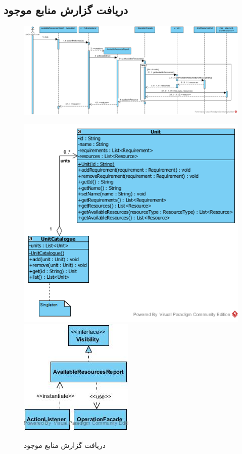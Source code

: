 \begin{landscape}
\section{دریافت گزارش منابع موجود}
\begin{figure}[H]
	\centering
	\includegraphics[scale=0.7]{img/sequence-design/AvailableResourcesReport}
\end{figure}
\begin{figure}[H]
	\centering
	\includegraphics[scale=0.7]{img/sequence-design/AvailableResourcesReportC}
	\includegraphics[scale=0.7]{img/sequence-design/AvailableResourcesReportUI}
	\caption{دریافت گزارش منابع موجود}
\end{figure}


\end{landscape}
